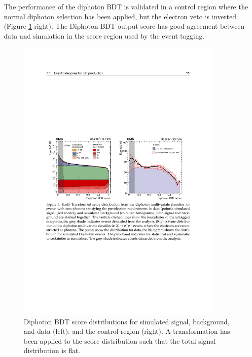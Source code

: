 The performance of the diphoton BDT is validated in a \Zee control region where the normal diphoton selection has been applied, but the electron veto is inverted (Figure \ref{fig:event_categorisaton:diphoton_bdt} right). The Diphoton BDT output score has good agreement between data and simulation in the score region used by the event tagging.
\begin{figure}[h!]
    \begin{center}
        \includegraphics[width=0.9\textwidth]{figures/event_selection/diphoton_BDT.pdf}
    \end{center}
    \caption{Diphoton BDT score distributions for simulated signal, background, and data (left); and the \Zee control region (right). 
             A transformation has been applied to the score distribution such that the total signal distribution is flat.}
        \label{fig:event_categorisaton:diphoton_bdt}
\end{figure}


